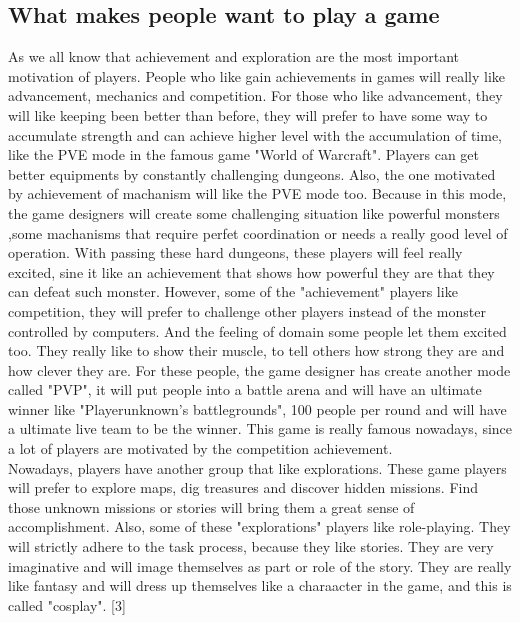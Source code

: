 \documentclass[12pt]{article}
\begin{document}
        \subsection{What makes people want to play a game}
            As we all know that achievement and exploration are the most important motivation of
            players. People who like gain achievements in games will really like advancement,
            mechanics and competition. For those who like advancement, they will like keeping been
            better than before, they will prefer to have some way to accumulate strength and can achieve
            higher level with the accumulation of time, like the PVE mode in the famous game "World of Warcraft".
            Players can get better equipments by constantly challenging dungeons. Also, the one
            motivated by achievement of machanism will like the PVE mode too. Because in this mode,
            the game designers will create some challenging situation like powerful monsters ,some
            machanisms that require perfet coordination or needs a really good level of operation.
            With passing these hard dungeons, these players will feel really excited, sine it like
            an achievement that shows how powerful they are that they can defeat such monster.
            However, some of the "achievement" players like competition, they will prefer to challenge
            other players instead of the monster controlled by computers.
            And the feeling of domain some people let them excited too. They really like to show their
            muscle, to tell others how strong they are and how clever they are. For these people, the
            game designer has create another mode called "PVP", it will put people into a battle arena
            and will have an ultimate winner like "Playerunknown's battlegrounds", 100 people per round and will have a ultimate
            live team to be the winner. This game is really famous nowadays, since a lot of players
            are motivated by the competition achievement.\\

            Nowadays, players have another group that like explorations. These game players will
            prefer to explore maps, dig treasures and discover hidden missions. Find those unknown
            missions or stories will bring them a great sense of accomplishment. Also, some of these
            "explorations" players like role-playing. They will strictly adhere to the task process,
            because they like stories. They are very imaginative and will image themselves as part
            or role of the story. They are really like fantasy and will dress up themselves like
            a charaacter in the game, and this is called "cosplay".
            [3]
\end{document}

